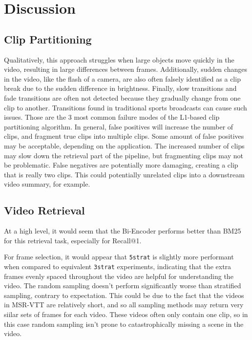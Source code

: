 \section{Discussion}

\subsection{Clip Partitioning}

Qualitatively, this approach struggles when large objects move quickly in the video, resulting in large differences between frames.
Additionally, sudden changes in the video, like the flash of a camera, are also often falsely identified as a clip break due to the sudden difference in brightness.
Finally, slow transitions and fade transitions are often not detected because they gradually change from one clip to another.
Transitions found in traditional sports broadcasts can cause such issues.
Those are the 3 most common failure modes of the L1-based clip partitioning algorithm.
In general, false positives will increase the number of clips, and fragment true clips into multiple clips.
Some amount of false positives may be acceptable, depending on the application.
The increased number of clips may slow down the retrieval part of the pipeline, but fragmenting clips may not be problematic.
False negatives are potentially more damaging, creating a clip that is really two clips.
This could potentially unrelated clips into a downstream video summary, for example.

\subsection{Video Retrieval}

At a high level, it would seem that the Bi-Encoder performs better than BM25 for this retrieval task, especially for Recall@1.

For frame selection, it would appear that \verb|5strat| is slightly more performant when compared to equivalent \verb|3strat| experiments, indicating that the extra frames evenly spaced throughout the video are helpful for understanding the video.
The random sampling doesn't perform significantly worse than stratified sampling, contrary to expectation.
This could be due to the fact that the videos in MSR-VTT are relatively short, and so all sampling methods may return very siilar sets of frames for each video.
These videos often only contain one clip, so in this case random sampling isn't prone to catastrophically missing a scene in the video.

